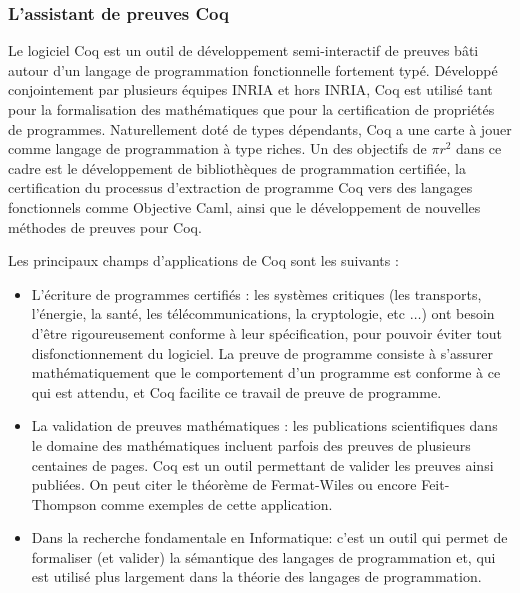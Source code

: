 \documentclass[a4paper, 11pt]{report}
\newcommand{\pir}[0]{\textbf{$\pi r^2$}\xspace}
\begin{document}
      \subsubsection{L'assistant de preuves Coq}
      Le logiciel Coq est un outil de développement semi-interactif de
      preuves bâti autour d'un langage de programmation fonctionnelle
      fortement typé. Développé conjointement par plusieurs équipes INRIA et
      hors INRIA, Coq est utilisé tant pour la formalisation des
      mathématiques que pour la certification de propriétés de programmes.
      Naturellement doté de types dépendants, Coq a une carte à jouer comme
      langage de programmation à type riches. Un des objectifs de \pir dans
      ce cadre est le développement de bibliothèques de programmation
      certifiée, la certification du processus d'extraction de programme Coq
      vers des langages fonctionnels comme Objective Caml, ainsi que le
      développement de nouvelles méthodes de preuves pour Coq.

      Les principaux champs d'applications de Coq sont les suivants :
      \begin{itemize}
        \item L'écriture de programmes certifiés : les systèmes critiques
          (les transports, l'énergie, la santé, les télécommunications, la
          cryptologie, etc $\ldots$) ont besoin d'être rigoureusement conforme
          à leur spécification, pour pouvoir éviter tout disfonctionnement
          du logiciel. La preuve de programme consiste à s'assurer
          mathématiquement que le comportement d'un programme est conforme à
          ce qui est attendu, et Coq facilite ce travail de preuve de programme.
      \item La validation de preuves mathématiques : les publications
          scientifiques dans le domaine des mathématiques incluent parfois
          des preuves de plusieurs centaines de pages. Coq est un outil
          permettant de valider les preuves ainsi publiées. On peut citer
          le théorème de Fermat-Wiles ou encore Feit-Thompson comme exemples
          de cette application.
        \item Dans la recherche fondamentale en Informatique: c'est un outil
          qui permet de formaliser (et valider) la sémantique des langages de
          programmation et, qui est utilisé plus largement dans la théorie
          des langages de programmation.
      \end{itemize}
\end{document}
